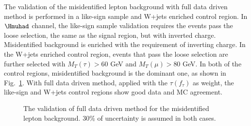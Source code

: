 The validation of the misidentified lepton background with full data driven method is performed in a like-sign sample and W+jets enriched control region. In $\Hmuhad$ channel, the like-sign sample validation requires the events pass the loose selection, the same as the signal region, but with inverted charge. Misidentified background is enriched with the requirement of inverting charge. In the W+jets enriched control region, events that pass the loose selection are further selected with  $M_T(\tau)>60$ GeV and $M_T(\mu)>80$ GeV.  In both of the control regions, misidentified background is the dominant one, as shown in Fig.~\ref{fig:fakebackgroundValidation}. With full data driven method, applied with the $\tau(f_{\tau})$ as weight, the like-sign and W+jets control regions show good data and MC agreement. 


\begin{figure}[htbp] 
     \centering
     \caption{The validation of full data driven method for the misidentified lepton background. 30\% of uncertainty is assumed in both cases. }
     \label{fig:fakebackgroundValidation}
\end{figure}









